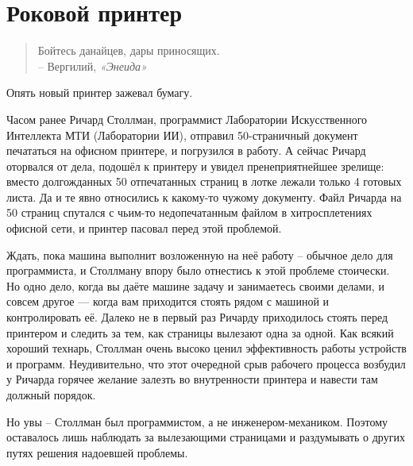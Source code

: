 
\chapter{Роковой принтер}

\begin{quotation}
  \begin{flushright}
    Бойтесь данайцев, дары приносящих.\\
    -- Вергилий, \textit{«Энеида»}
  \end{flushright}
\end{quotation}

Опять новый принтер зажевал бумагу.

Часом ранее Ричард Столлман, программист Лаборатории Искусственного Интеллекта МТИ (Лаборатории ИИ), отправил 50-страничный документ печататься на офисном принтере, и погрузился в работу. А сейчас Ричард оторвался от дела, подошёл к принтеру и увидел пренеприятнейшее зрелище: вместо долгожданных 50 отпечатанных страниц в лотке лежали только 4 готовых листа. Да и те явно относились к какому-то чужому документу. Файл Ричарда на 50 страниц спутался с чьим-то недопечатанным файлом в хитросплетениях офисной сети, и принтер пасовал перед этой проблемой.

Ждать, пока машина выполнит возложенную на неё работу -- обычное дело для программиста, и Столлману впору было отнестись к этой проблеме стоически. Но одно дело, когда вы даёте машине задачу и занимаетесь своими делами, и совсем другое — когда вам приходится стоять рядом с машиной и контролировать её. Далеко не в первый раз Ричарду приходилось стоять перед принтером и следить за тем, как страницы вылезают одна за одной. Как всякий хороший технарь, Столлман очень высоко ценил эффективность работы устройств и программ. Неудивительно, что этот очередной срыв рабочего процесса возбудил у Ричарда горячее желание залезть во внутренности принтера и навести там должный порядок.

Но увы -- Столлман был программистом, а не инженером-механиком. Поэтому оставалось лишь наблюдать за вылезающими страницами и раздумывать о других путях решения надоевшей проблемы.

